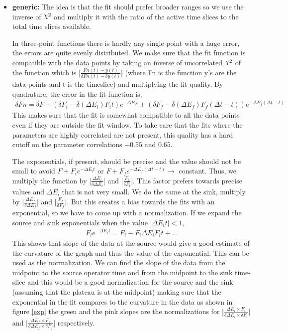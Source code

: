 \documentclass[10pt]{article}
\DeclareRobustCommand{\rchi}{{\mathpalette\irchi\relax}}
\newcommand{\irchi}[2]{\raisebox{\depth}{$#1\chi$}} %
\begin{document}
\begin{itemize}
  \item \textbf{ {\myfont generic: }}The idea is that the fit should prefer broader ranges so we use the inverse of $\rchi^2$ and multiply it with the ratio of the active time slices to the total time slices available. \par
  In three-point functions there is hardly any single point with a huge error, the errors are quite evenly distributed. We make sure that the fit function is compatible with the data points by taking an inverse of uncorrelated $\rchi^2$ of the function which is |$\frac{Fn(t) - y(t)}{\delta Fn(t) - \delta y(t)}$| (where Fn is the function y's are the data points and t is the timeslice) and multiplying the fit-quality. By quadrature, the error in the fit function is,
  \begin{align*}
  \delta Fn = \delta F + (\delta F_i - \delta (\Delta E_i) F_i t ) e^{-\Delta E_i t} + (\delta F_f - \delta (\Delta E_f) F_f (\Delta t - t) ) e^{-\Delta E_f (\Delta t - t)}
  \end{align*} 
 This makes sure that the fit is somewhat compatible to all the data points even if they are outside the fit window. To take care that the fits where the parameters are highly correlated are not present, this quality has a hard cutoff  on the parameter correlations $-0.55$ and $0.65$. \par
  The exponentials, if present, should be precise and the value should not be small to avoid $F + F_i e^{-\Delta E_i t}$ or $ F + F_f e^{-\Delta E_f (\Delta t - t)}\rightarrow$ constant. Thus, we multiply the function by |$\frac{\Delta E_i}{\delta \Delta E_i}$| and |$\frac{F_i}{\delta F_i}$|. This factor prefers towards precise values and $\Delta E_i$ that is not very small. We do the same at the sink, multiply by |$\frac{\Delta E_f}{\delta \Delta E_f}$| and |$\frac{ F_f}{\delta F_f}$|.  But this creates a bias towards the fits with an exponential, so we have to come up with a normalization. If we expand the source and sink exponentials when the value $|\Delta E_i t| < 1$,
\begin{align*}
F_ie^{-\Delta E_i t} = F_i - F_i \Delta E_i F_i t + ...
\end{align*}
This shows that slope of the data at the source would give a good estimate of the curvature of the graph and thus the value of the exponential. This can be used as the normalization. We can find the slope of the data from the midpoint to the source operator time and from the midpoint to the sink time-slice and this would be a good normalization for the source and the sink (assuming that the plateau is at the midpoint) making sure that the exponential in the fit compares to the curvature in the data as shown in figure \ref{exp} the green and the pink slopes are the normalizations for |$\frac{\Delta E_i\times F_i}{\delta \Delta E_i\times \delta F_i}$| and  |$\frac{\Delta E_f\times F_f}{\delta \Delta E_f\times \delta F_f}$| respectively. \par

\end{itemize}
\end{document}
